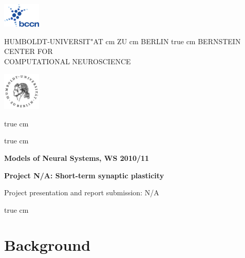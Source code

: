 \documentclass[12pt]{article}
\begin{document}
\parbox{2cm}{
\includegraphics[width=1.8cm]{../bccnlogo.pdf}
}
\parbox{11cm}{
\begin{center}
\large HUMBOLDT-UNIVERSIT"AT  cm ZU  cm BERLIN
 true cm
\mgross BERNSTEIN CENTER FOR\\ COMPUTATIONAL NEUROSCIENCE
\end{center}
}
\parbox{2cm}
{
\hfill
\includegraphics[width=1.8cm]{../hublogo.pdf}
}

 true cm



 true cm
\centerline{\bf Models of Neural Systems, WS 2010/11}
\centerline{\bf Project N/A: Short-term synaptic plasticity} 
\centerline{Project presentation and report submission: N/A}

 true cm

\section{Background}
\end{document}

